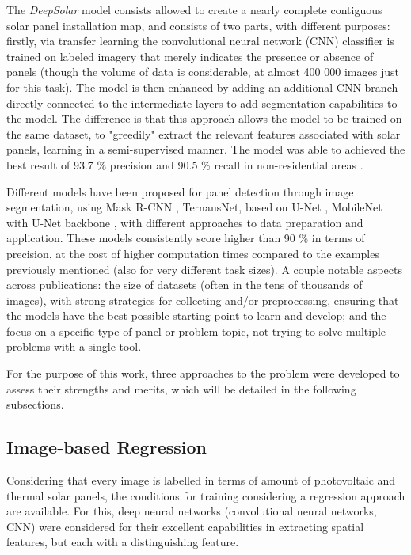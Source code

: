 \documentclass[conference]{IEEEtran}
\begin{document}
The \textit{DeepSolar} model consists allowed to create a nearly complete contiguous solar panel installation map, and consists of two parts, with different purposes: firstly, via transfer learning the convolutional neural network (CNN) classifier is trained on labeled imagery that merely indicates the presence or absence of panels (though the volume of data is considerable, at almost 400 000 images just for this task). The model is then enhanced by adding an additional CNN branch directly connected to the intermediate layers to add segmentation capabilities to the model. The difference is that this approach allows the model to be trained on the same dataset, to "greedily" extract the relevant features associated with solar panels, learning in a semi-supervised manner. The model was able to achieved the best result of 93.7 \% precision and 90.5 \% recall in non-residential areas \cite{Yu2018DeepSolar}.

Different models have been proposed for panel detection through image segmentation, using Mask R-CNN \cite{maskrcnn} , TernausNet, based on U-Net \cite{KAUSIKA2021100111}, MobileNet with U-Net backbone \cite{wani2021segmentation}, with different approaches to data preparation and application. These models consistently score higher than 90 \% in terms of precision, at the cost of higher computation times compared to the examples previously mentioned (also for very different task sizes). A couple notable aspects across publications: the size of datasets (often in the tens of thousands of images), with strong strategies for collecting and/or preprocessing, ensuring that the models have the best possible starting point to learn and develop; and the focus on a specific type of panel or problem topic, not trying to solve multiple problems with a single tool.

For the purpose of this work, three approaches to the problem were developed to assess their strengths and merits, which will be detailed in the following subsections.

\subsection{Image-based Regression}

Considering that every image is labelled in terms of amount of photovoltaic and thermal solar panels, the conditions for training considering a regression approach are available. For this, deep neural networks (convolutional neural networks, CNN) were considered for their excellent capabilities in extracting spatial features, but each with a distinguishing feature.
\end{document}
